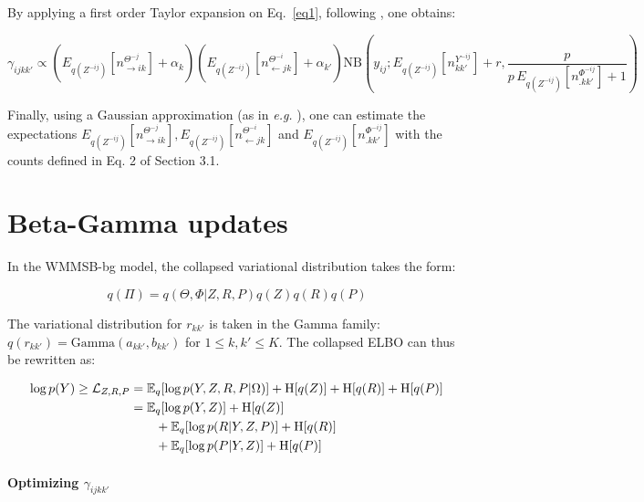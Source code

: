 By applying a first order Taylor expansion on Eq.~\eqref{eq1}, following \cite{teh2007collapsed}, one obtains:

\begin{equation}
\gamma_{ijkk'} \propto (E_{q(Z^{-ij})}[n_{\rightarrow ik}^{\Theta^{-j}}] + \alpha_k) (E_{q(Z^{-ij})}[n_{\leftarrow jk}^{\Theta^{-i}}] + \alpha_{k'}) \mathrm{NB}\left(y_{ij}; E_{q(Z^{-ij})}[n^{Y^{-ij}}_{kk'}] + r, \frac{p}{p\,E_{q(Z^{-ij})}[n^{\Phi^{-ij}}_{\bm{.}kk'}] + 1} \right) \nonumber
\end{equation}

Finally, using a Gaussian approximation (as in \textit{e.g.} \cite{asuncion2009smoothing}), one can estimate the expectations $E_{q(Z^{-ij})}[n_{\rightarrow ik}^{\Theta^{-j}}], E_{q(Z^{-ij})}[n_{\leftarrow jk}^{\Theta^{-i}}]$ and  $E_{q(Z^{-ij})}[n^{\Phi^{-ij}}_{\bm{.}kk'}]$ with the counts defined in Eq. 2 of Section 3.1.

\section{Beta-Gamma updates}

In the WMMSB-bg model, the collapsed variational distribution takes the form:

\begin{equation*}
q(\Pi) = q(\Theta, \Phi|Z, R, P) q(Z)q(R)q(P)
\end{equation*}

The variational distribution for $r_{kk'}$ is taken in the Gamma family:  $q(r_{kk'}) = \textrm{Gamma}(a_{kk'},b_{kk'})$ for $1\leq k,k' \leq K$. The collapsed ELBO can thus be rewritten as:

\begin{align*}
\log p(Y) \geq \mathcal{L}_{Z,R,P} &= \mathbb{E}_{q}[\log p(Y, Z, R, P|\Omega)] + \textrm{H}[q(Z)] + \textrm{H}[q(R)] + \textrm{H}[q(P)] \\
                        &= \mathbb{E}_{q}[\log p(Y, Z)] + \textrm{H}[q(Z)] \\
                        &\qquad + \mathbb{E}_{q}[\log p(R|Y,Z,P)] + \textrm{H}[q(R)] \\
                        &\qquad +\mathbb{E}_{q}[\log p(P|Y,Z)] + \textrm{H}[q(P)] 
\end{align*}

\paragraph{Optimizing $\gamma_{ijkk'}$}

